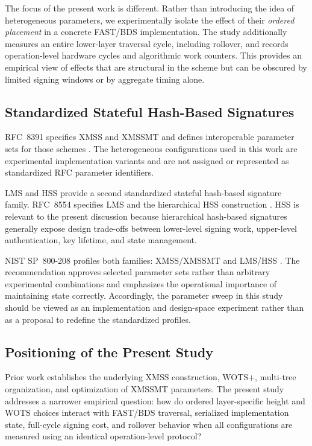 \documentclass[pdflatex,sn-mathphys-num]{sn-jnl}
\begin{document}
The focus of the present work is different. Rather than introducing the
idea of heterogeneous parameters, we experimentally isolate the effect
of their \emph{ordered placement} in a concrete FAST/BDS implementation.
The study additionally measures an entire lower-layer traversal cycle,
including rollover, and records operation-level hardware cycles and
algorithmic work counters. This provides an empirical view of effects
that are structural in the scheme but can be obscured by limited
signing windows or by aggregate timing alone.

\subsection{Standardized Stateful Hash-Based Signatures}
\label{sec:related_standards}

RFC~8391 specifies XMSS and XMSSMT and defines interoperable parameter
sets for those schemes \cite{RFC8391}. The heterogeneous configurations
used in this work are experimental implementation variants and are not
assigned or represented as standardized RFC parameter identifiers.

LMS and HSS provide a second standardized stateful hash-based signature
family. RFC~8554 specifies LMS and the hierarchical HSS construction
\cite{RFC8554}. HSS is relevant to the present discussion because
hierarchical hash-based signatures generally expose design trade-offs
between lower-level signing work, upper-level authentication, key
lifetime, and state management.

NIST SP~800-208 profiles both families: XMSS/XMSSMT and LMS/HSS
\cite{NIST800208}. The recommendation approves selected parameter
sets rather than arbitrary experimental combinations and emphasizes the
operational importance of maintaining state correctly. Accordingly, the
parameter sweep in this study should be viewed as an implementation and
design-space experiment rather than as a proposal to redefine the
standardized profiles.

\subsection{Positioning of the Present Study}
\label{sec:related_positioning}

Prior work establishes the underlying XMSS construction, WOTS+,
multi-tree organization, and optimization of XMSSMT parameters.
The present study addresses a narrower empirical question: how do
ordered layer-specific height and WOTS choices interact with FAST/BDS
traversal, serialized implementation state, full-cycle signing cost,
and rollover behavior when all configurations are measured using an
identical operation-level protocol?
\end{document}
